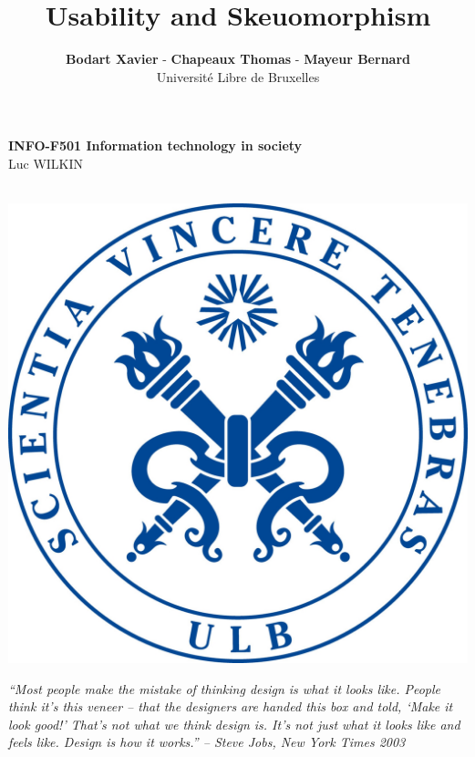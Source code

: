 \documentclass[a4paper,11pt] {article}
\theoremstyle{definition}
\begin{document}
\title{\textbf{Usability and Skeuomorphism}}
\author{\textbf{Bodart Xavier} - \textbf{Chapeaux Thomas} - \textbf{Mayeur Bernard} \\
Université Libre de Bruxelles}

\maketitle
\begin{center}

\textbf{INFO-F501 Information technology in society} \\
Luc WILKIN
\end{center}
\begin{center}

~\\

\includegraphics[scale=0.15]{fig-report/ULBjea.jpg}
\end{center}

\begin{center}

\textit{“Most people make the mistake of thinking design is what it looks like. People think it’s this veneer – that the designers are handed this box and told, ‘Make it look good!’ That’s not what we think design is. It’s not just what it looks like and feels like. Design is how it works.” – Steve Jobs, New York Times 2003
\\}
\end{center}
\end{document}

